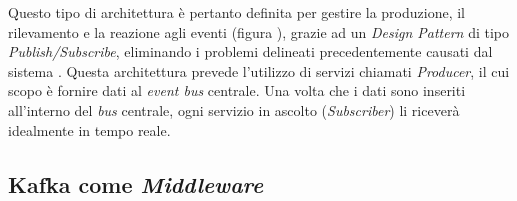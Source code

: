 Questo tipo di architettura è pertanto definita per gestire la produzione, il rilevamento e la reazione agli eventi (figura \thefigure), grazie ad un \textit{Design Pattern} di tipo \textit{Publish/Subscribe}, eliminando i problemi delineati precedentemente causati dal sistema .
Questa architettura prevede l'utilizzo di servizi chiamati \textit{Producer}, il cui scopo è fornire dati al \textit{event bus} centrale.
Una volta che i dati sono inseriti all'interno del \textit{bus} centrale, ogni servizio in ascolto (\textit{Subscriber}) li riceverà idealmente in tempo reale.
%
%
%
%


\subsection{Kafka come \textit{Middleware}}


